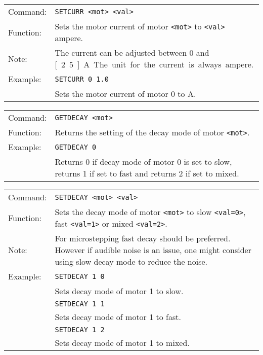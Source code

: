 \vspace{\vdistace}

\begin{table}[h]
  \begin{tabularx}{\textwidth}{lX}
    Command:  & \texttt{SETCURR <mot> <val>}\\
    Function: & Sets the motor current of motor \texttt{<mot>} to \texttt{<val>} ampere.\\
    Note:     & The current can be adjusted between 0 and \unit[2.5]{A}. The unit for the current is always ampere.\\
    Example:  & \texttt{SETCURR 0 1.0}\\
              & Sets the motor current of motor 0 to \unit[1]{A}.
  \end{tabularx}
\end{table}

\vspace{\vdistace}

\begin{table}[h]
  \begin{tabularx}{\textwidth}{lX}
    Command:  & \texttt{GETDECAY <mot>}\\
    Function: & Returns the setting of the decay mode of motor \texttt{<mot>}.\\
    Example:  & \texttt{GETDECAY 0}\\
              & Returns 0 if decay mode of motor 0 is set to slow, returns 1 if set to fast and returns 2 if set to mixed.
  \end{tabularx}
\end{table}

\vspace{\vdistace}

\begin{table}[h]
  \begin{tabularx}{\textwidth}{lX}
    Command:  & \texttt{SETDECAY <mot> <val>}\\
    Function: & Sets the decay mode of motor \texttt{<mot>} to slow \texttt{<val=0>}, fast \texttt{<val=1>} or mixed \texttt{<val=2>}.\\
    Note:     & For microstepping fast decay should be preferred. However if audible noise is an issue, one might consider using slow decay mode to reduce the noise.\\
    Example:  & \texttt{SETDECAY 1 0}\\
              & Sets decay mode of motor 1 to slow.\\
              & \texttt{SETDECAY 1 1}\\
              & Sets decay mode of motor 1 to fast.\\
              & \texttt{SETDECAY 1 2}\\
              & Sets decay mode of motor 1 to mixed.
  \end{tabularx}
\end{table}

